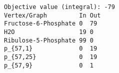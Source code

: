 \begin{verbatim}
Objective value (integral): -79
Vertex/Graph         In Out 
Fructose-6-Phosphate 0  79  
H2O                  19 0   
Ribulose-5-Phosphate 99 0   
p_{57,1}             0  19  
p_{57,25}            0  19  
p_{57,9}             0  1   
\end{verbatim}
